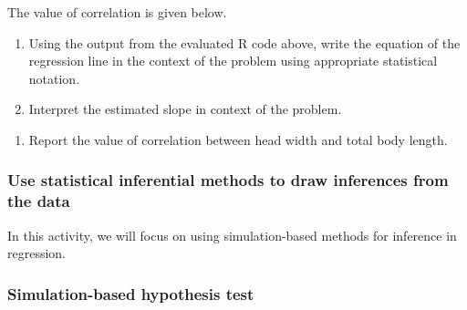 \documentclass[
]{report}
\newenvironment{Shaded}{\begin{snugshade}}{\end{snugshade}}
\newcommand{\CommentTok}[1]{\textcolor[rgb]{0.56,0.35,0.01}{\textit{#1}}}
\newcommand{\FunctionTok}[1]{\textcolor[rgb]{0.00,0.00,0.00}{#1}}
\newcommand{\NormalTok}[1]{#1}
\newcommand{\SpecialCharTok}[1]{\textcolor[rgb]{0.00,0.00,0.00}{#1}}
\providecommand{\tightlist}{%
  \setlength{\itemsep}{0pt}\setlength{\parskip}{0pt}}
\begin{document}
The value of correlation is given below.

\begin{Shaded}
\end{Shaded}

\begin{enumerate}
\def\labelenumi{\arabic{enumi}.}
\setcounter{enumi}{4}
\item
  Using the output from the evaluated R code above, write the equation of the regression line in the context of the problem using appropriate statistical notation.
  \vspace{1in}
\item
  Interpret the estimated slope in context of the problem.
\end{enumerate}

\vspace{1in}

\begin{enumerate}
\def\labelenumi{\arabic{enumi}.}
\setcounter{enumi}{6}
\tightlist
\item
  Report the value of correlation between head width and total body length.
\end{enumerate}

\vspace{0.3in}

\hypertarget{use-statistical-inferential-methods-to-draw-inferences-from-the-data-5}{%
\subsubsection*{Use statistical inferential methods to draw inferences from the data}\label{use-statistical-inferential-methods-to-draw-inferences-from-the-data-5}}

In this activity, we will focus on using simulation-based methods for inference in regression.

\hypertarget{simulation-based-hypothesis-test}{%
\subsubsection*{Simulation-based hypothesis test}\label{simulation-based-hypothesis-test}}
\end{document}
